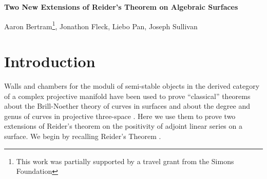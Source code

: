 \documentclass{amsart}
\begin{document}
\newcommand{\BB}{{\mathbb B}}
\newcommand{\CC}{{\mathbb C}}
\newcommand{\GG}{{\mathbb G}}
\newcommand{\HH}{{\mathbb H}}
\newcommand{\PP}{{\mathbb P}}
\newcommand{\QQ}{{\mathbb Q}}
\newcommand{\RR}{{\mathbb R}}
\newcommand{\TT}{{\mathbb T}}
\newcommand{\ZZ}{{\mathbb Z}}

\newcommand{\cA}{{\mathcal A}}
\newcommand{\cC}{{\mathcal C}}
\newcommand{\Coh}{{\mathcal Coh}}
\newcommand{\cD}{{\mathcal D}}
\newcommand{\cE}{{\mathcal E}}
\newcommand{\cF}{{\mathcal F}}               
\newcommand{\cI}{{\mathcal I}}
\newcommand{\cH}{{\mathcal H}}
\newcommand{\cM}{{\mathcal M}}
\newcommand{\cO}{{\mathcal O}}
\newcommand{\cS}{{\mathcal S}}
\newcommand{\cSets}{{\mathcal Sets}}
\newcommand{\cSub}{{\mathcal Sub}}
\newcommand{\cT}{{\mathcal T}}
\newcommand{\cZ}{{\mathcal Z}}

\newcommand{\bl}{\mbox{bl}} 
\newcommand{\ch}{\mbox{ch}}
\newcommand{\coker}{\mbox{coker}}
\newcommand{\Ext}{\mbox{Ext}}
\newcommand{\Hilb}{\mbox{Hilb}}
\newcommand{\Hom}{\mbox{Hom}} 
\newcommand{\rH}{\mbox{H}} 
\newcommand{\im}{\mbox{Im}}
\newcommand{\length}{\mbox{length}}
\newcommand{\NS}{\mbox{NS}}
\newcommand{\ord}{{\rm ord}}
\newcommand{\rk}{\mbox{rk}}
\newcommand{\re}{{\rm Re}}
\newcommand{\Quot}{{\rm Quot}}
\newcommand{\Sym}{\mbox{Sym}}

\newcommand{\id}{\mbox{id}}
\newcommand{\tr}{\mbox{tr}}
\newcommand{\End}{\mbox{End}}
\newcommand{\Aut}{\mbox{Aut}}
\newcommand{\Perm}{{\rm Perm}}
\newcommand{\sgn}{{\rm sgn}}
\newcommand{\PGL}{{\rm PGL}}
\newcommand{\Pic}{{\rm Pic}}

\newcommand{\Sec}{{\rm Sec}}

\newcommand{\fun}{\rightarrow}
\newcommand{\nt}{\noindent}


\begin{center}

{\bf Two New Extensions of Reider's Theorem on Algebraic Surfaces}

\medskip

Aaron Bertram\footnote{This work was partially supported by a travel grant from the Simons Foundation}, Jonathon Fleck,  Liebo Pan, Joseph Sullivan

\end{center}

\section{Introduction} 

Walls and chambers for the moduli of semi-stable objects  in the derived category of a complex projective manifold have been used to prove
``classical'' theorems about the Brill-Noether theory of curves in surfaces \cite{Ba,BL, BM1, BM2, FFR}
and about the degree and genus of curves in projective three-space \cite{MS2}. Here we use them
to prove two extensions of Reider's theorem on the positivity of adjoint linear series on a surface. We begin by recalling 
Reider's Theorem \cite{Re}.  
\end{document}
